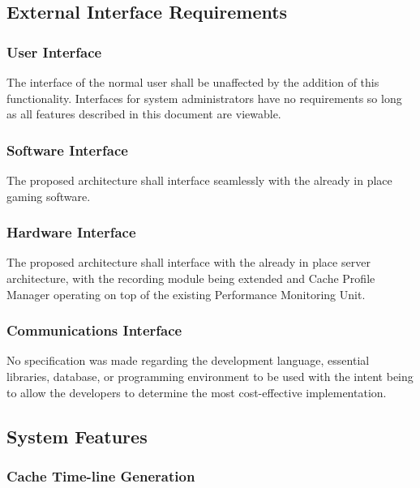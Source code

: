 \documentclass[12pt]{article}
\begin{document}
\subsection{External Interface Requirements}

\subsubsection{User Interface}

The interface of the normal user shall be unaffected by the addition of this functionality. Interfaces for system
administrators have no requirements so long as all features described in this document are viewable.

\subsubsection{Software Interface}

The proposed architecture shall interface seamlessly with the already in place gaming software.

\subsubsection{Hardware Interface}

The proposed architecture shall interface with the already in place server architecture, with the recording module
being extended and Cache Profile Manager operating on top of the existing Performance Monitoring Unit.

\subsubsection{Communications Interface}

No specification was made regarding the development language, essential libraries, database, or programming
environment to be used with the intent being to allow the developers to determine the most cost-effective implementation.

\subsection{System Features}

\subsubsection{Cache Time-line Generation}
\end{document}
